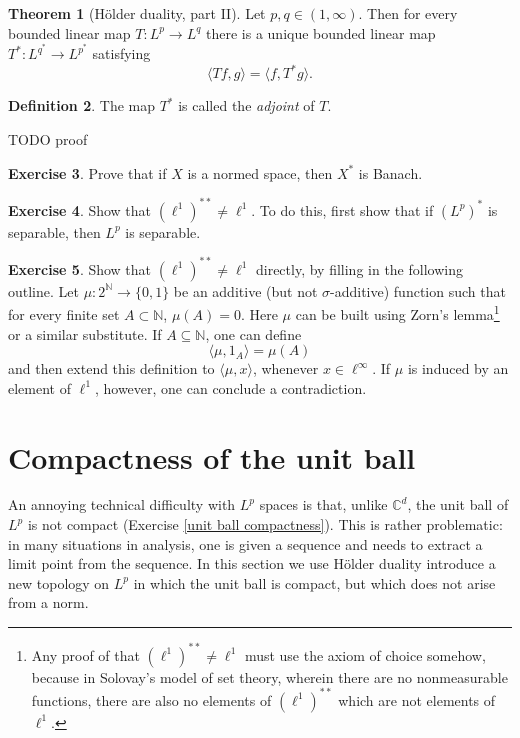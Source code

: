 \documentclass[12pt]{book}
\newcommand{\NN}{\mathbb{N}}
\newcommand{\CC}{\mathbb{C}}
\newcommand{\dfn}[1]{\emph{#1}\index{#1}}
\theoremstyle{definition}
\newtheorem{theorem}{Theorem}[section]
\newtheorem{definition}[theorem]{Definition}
\newtheorem{exercise}[theorem]{Exercise}
\begin{document}
\begin{theorem}[H\"older duality, part II]
Let $p, q \in (1, \infty)$. Then for every bounded linear map $T: L^p \to L^q$ there is a unique bounded linear map $T^*: L^{q^*} \to L^{p^*}$ satisfying
$$\langle Tf, g\rangle = \langle f, T^*g\rangle.$$
\end{theorem}
\begin{definition}
The map $T^*$ is called the \dfn{adjoint} of $T$.
\end{definition}
TODO proof





\begin{exercise}
\label{dual space is banach}
Prove that if $X$ is a normed space, then $X^*$ is Banach.
\end{exercise}

\begin{exercise}
Show that $(\ell^1)^{**} \neq \ell^1$.
To do this, first show that if $(L^p)^*$ is separable, then $L^p$ is separable.
\end{exercise}

\begin{exercise}
Show that $(\ell^1)^{**} \neq \ell^1$ directly, by filling in the following outline.
Let $\mu: 2^\NN \to \{0, 1\}$ be an additive (but not $\sigma$-additive) function such that for every finite set $A \subset \NN$, $\mu(A) = 0$.
Here $\mu$ can be built using Zorn's lemma\footnote{Any proof of that $(\ell^1)^{**} \neq \ell^1$ must use the axiom of choice somehow, because in Solovay's model of set theory, wherein there are no nonmeasurable functions, there are also no elements of $(\ell^1)^{**}$ which are not elements of $\ell^1$.} or a similar substitute.
If $A \subseteq \NN$, one can define
$$\langle \mu, 1_A\rangle = \mu(A)$$
and then extend this definition to $\langle \mu, x\rangle$, whenever $x \in \ell^\infty$.
If $\mu$ is induced by an element of $\ell^1$, however, one can conclude a contradiction.
\end{exercise}

\section{Compactness of the unit ball}
An annoying technical difficulty with $L^p$ spaces is that, unlike $\CC^d$, the unit ball of $L^p$ is not compact (Exercise \ref{unit ball compactness}).
This is rather problematic: in many situations in analysis, one is given a sequence and needs to extract a limit point from the sequence.
In this section we use H\"older duality introduce a new topology on $L^p$ in which the unit ball is compact, but which does not arise from a norm.
\end{document}
